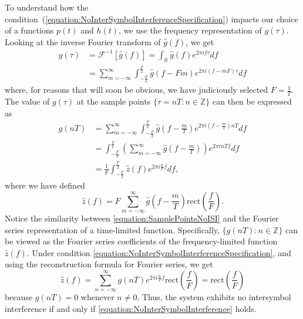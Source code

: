 To understand how the condition~(\ref{equation:NoInterSymbolInterferenceSpecification}) impacts our choice of a functions $p(t)$ and $h (t)$, we use the frequency representation of $g(\tau)$.
Looking at the inverse Fourier transform of $\hat{g}(f)$, we get
\begin{equation*}
\begin{split}
g(\tau) &= \mathcal{F}^{-1} \left[ \hat{g} (f) \right]
= \int_{\mathbb{R}} \hat{g}(f) e^{2 \pi i f \tau} df \\
&= \sum_{m = -\infty}^{\infty} \int_{-\frac{F}{2}}^{\frac{F}{2}}
\hat{g} (f - Fm) e^{2 \pi i (f - mF) \tau} df
\end{split}
\end{equation*}
where, for reasons that will soon be obvious, we have judiciously selected $F = \frac{1}{T}$.
The value of $g(\tau)$ at the sample points $\{ \tau = nT : n \in \mathbb{Z} \}$ can then be expressed as
\begin{equation} \label{equation:SamplePointsNoISI}
\begin{split}
g(nT) &= \sum_{m = -\infty}^{\infty} \int_{-\frac{F}{2}}^{\frac{F}{2}}
\hat{g} \left( f - \frac{m}{T} \right) e^{2 \pi i \left( f - \frac{m}{T} \right) nT} df \\
&= \int_{-\frac{F}{2}}^{\frac{F}{2}}
\left( \sum_{m = -\infty}^{\infty} \hat{g} \left( f - \frac{m}{T} \right) \right)
e^{2 \pi i n T f} df \\
&= \frac{1}{F} \int_{-\frac{F}{2}}^{\frac{F}{2}}
\hat{z} (f) e^{2 \pi i \frac{n}{F} f} df ,
\end{split}
\end{equation}
where we have defined
\begin{equation*}
\hat{z}(f) = F \sum_{m = -\infty}^{\infty} \hat{g} \left( f - \frac{m}{T} \right)
\mathrm{rect} \left( \frac{f}{F} \right) .
\end{equation*}
Notice the similarity between \eqref{equation:SamplePointsNoISI} and the Fourier series representation of a time-limited function.
Specifically, $\{ g(nT) : n \in \mathbb{Z} \}$ can be viewed as the Fourier series coefficients of the frequency-limited function $\hat{z}(f)$.
Under condition \eqref{equation:NoInterSymbolInterferenceSpecification}, and using the reconstruction formula for Fourier series, we get
\begin{equation} \label{equation:NoInterSymbolInterference}
\hat{z}(f) = \sum_{n = -\infty}^{\infty} g(nT) e^{2 \pi i \frac{n}{F} f}
\mathrm{rect} \left( \frac{f}{F} \right)
= \mathrm{rect} \left( \frac{f}{F} \right)
\end{equation}
because $g(nT) = 0$ whenever $n \neq 0$.
Thus, the system exhibits no intersymbol interference if and only if \eqref{equation:NoInterSymbolInterference} holds.

